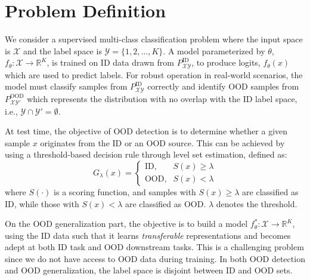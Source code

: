 
\section{Problem Definition}
\label{sec:problem_definition}

We consider a supervised multi-class classification problem where the input space is \( \mathcal{X} \) and the label space is \( \mathcal{Y} = \{1, 2, \dots, K\} \). 
A model parameterized by \( \theta \), \( f_\theta: \mathcal{X} \to \mathbb{R}^K \), is trained on ID data drawn from \( P_{\mathcal{X}\mathcal{Y}}^{\text{ID}} \), to produce logits, \(f_\theta (x)\) which are used to predict labels. 
For robust operation in real-world scenarios, the model must classify samples from \( P_{\mathcal{X}\mathcal{Y}}^{\text{ID}} \) correctly and identify OOD samples from \( P_{\mathcal{X}\mathcal{Y}'}^{\text{OOD}} \) which represents the distribution with no overlap with the ID label space, i.e., \( \mathcal{Y} \cap \mathcal{Y}' = \emptyset \).

At test time, the objective of OOD detection is to determine whether a given sample \( x \) originates from the ID or an OOD source. This can be achieved by using a threshold-based decision rule through level set estimation, defined as:
\begin{equation*}
    G_\lambda(x) = 
    \begin{cases} 
    \text{ID}, & S(x) \geq \lambda \\ 
    \text{OOD}, & S(x) < \lambda
    \end{cases}
\end{equation*}
where \( S (\cdot) \) is a scoring function, and samples with \( S(x) \geq \lambda \) are classified as ID, while those with \( S(x) < \lambda \) are classified as OOD. \( \lambda \) denotes the threshold.

On the OOD generalization part, the objective is to build a model \( f^*_\theta: \mathcal{X} \rightarrow \mathbb{R}^{K} \), using the ID data such that it learns \emph{transferable} representations and becomes adept at both ID task and OOD downstream tasks. This is a challenging problem since we do not have access to OOD data during training.
In both OOD detection and OOD generalization, the label space is disjoint between ID and OOD sets.

